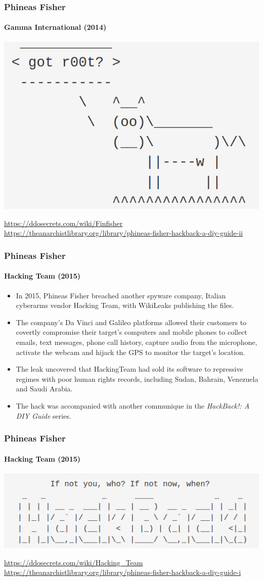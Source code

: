 \documentclass[aspectratio=169,usenames,dvipsnames]{beamer}
\begin{document}
\begin{frame}[c]
  \frametitle{Phineas Fisher}
  \framesubtitle{Gamma International (2014)}

  \centering
  \includegraphics[width=.49\textwidth,height=.49\textheight,keepaspectratio]{img/phineas_fisher.png}
  \vspace{5mm}

  \footnotesize
  \url{https://ddosecrets.com/wiki/Finfisher}\\
  \url{https://theanarchistlibrary.org/library/phineas-fisher-hackback-a-diy-guide-ii}
\end{frame}

\begin{frame}
  \frametitle{Phineas Fisher}
  \framesubtitle{Hacking Team (2015)}

  \begin{itemize}[<+->]
    \item In 2015, Phineas Fisher breached another spyware company,
      Italian cyberarms vendor Hacking Team, with WikiLeaks publishing the
      files.
    \item The company's Da Vinci and Galileo platforms allowed their customers
      to covertly compromise their target's computers and mobile phones to
      collect emails, text messages, phone call history, capture audio from
      the microphone, activate the webcam and hijack the GPS to monitor the
      target's location.
    \item The leak uncovered that HackingTeam had sold its software to
      repressive regimes with poor human rights records, including Sudan,
      Bahrain, Venezuela and Saudi Arabia.
    \item The hack was accompanied with another communique in the
      \emph{HackBack!: A DIY Guide} series.
  \end{itemize}

\end{frame}

\begin{frame}
  \frametitle{Phineas Fisher}
  \framesubtitle{Hacking Team (2015)}

  \centering
  \includegraphics[width=.49\textwidth,height=.49\textheight,keepaspectratio]{img/hackback2.png}
  \vspace{1cm}

  \footnotesize
  \url{https://ddosecrets.com/wiki/Hacking_Team}\\
  \url{https://theanarchistlibrary.org/library/phineas-fisher-hackback-a-diy-guide-i}
\end{frame}
\end{document}
